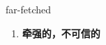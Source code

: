 
\begin{frame}
{\huge far-fetched}
\begin{center}
\begin{enumerate}\Large
  \item \textbf{牵强的，不可信的}
\end{enumerate}
\end{center}
\end{frame}
